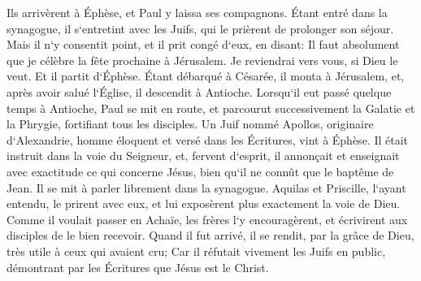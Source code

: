 \verse Ils arrivèrent à Éphèse, et Paul y laissa ses compagnons. Étant entré dans la synagogue, il s`entretint avec les Juifs, 
\verse qui le prièrent de prolonger son séjour. 
\verse Mais il n`y consentit point, et il prit congé d`eux, en disant: Il faut absolument que je célèbre la fête prochaine à Jérusalem. Je reviendrai vers vous, si Dieu le veut. Et il partit d`Éphèse. 
\verse Étant débarqué à Césarée, il monta à Jérusalem, et, après avoir salué l`Église, il descendit à Antioche. 
\verse Lorsqu`il eut passé quelque temps à Antioche, Paul se mit en route, et parcourut successivement la Galatie et la Phrygie, fortifiant tous les disciples. 
\verse Un Juif nommé Apollos, originaire d`Alexandrie, homme éloquent et versé dans les Écritures, vint à Éphèse. 
\verse Il était instruit dans la voie du Seigneur, et, fervent d`esprit, il annonçait et enseignait avec exactitude ce qui concerne Jésus, bien qu`il ne connût que le baptême de Jean. 
\verse Il se mit à parler librement dans la synagogue. Aquilas et Priscille, l`ayant entendu, le prirent avec eux, et lui exposèrent plus exactement la voie de Dieu. 
\verse Comme il voulait passer en Achaïe, les frères l`y encouragèrent, et écrivirent aux disciples de le bien recevoir. Quand il fut arrivé, il se rendit, par la grâce de Dieu, très utile à ceux qui avaient cru; 
\verse Car il réfutait vivement les Juifs en public, démontrant par les Écritures que Jésus est le Christ. 

\chapter{}

